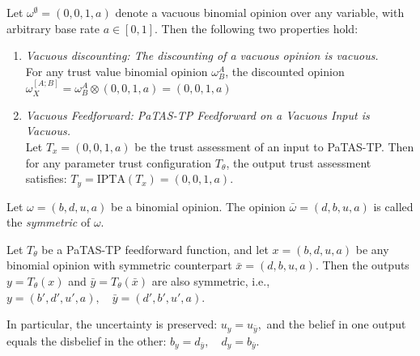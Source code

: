 \begin{theorem}\label{thm:infvac}
Let \( \omega^\emptyset = (0, 0, 1, a) \) denote a vacuous binomial opinion over any variable, with arbitrary base rate \( a \in [0, 1] \). Then the following two properties hold:

\begin{enumerate}
    \item \emph{Vacuous discounting: The discounting of a vacuous opinion is vacuous.} \\
    For any trust value binomial opinion \(\omega^A_B \), the discounted opinion
    \(
    \omega^{[A;B]}_X = \omega^A_B \otimes (0,0,1,a)= (0,0,1,a)
    \)
    \item \emph{Vacuous Feedforward: \ac{PaTAS-TP} Feedforward on a Vacuous Input is Vacuous.} \\
     Let \( T_x = (0,0,1,a)\) be the trust assessment of an input to \ac{PaTAS-TP}. Then for any parameter trust configuration \( T_\theta \), the output trust assessment satisfies:
    \(
    T_y = \text{IPTA}(T_x) = (0,0,1,a).
    \)
\end{enumerate}
\end{theorem}
\begin{definition}
Let \(\omega=(b, d, u, a)\) be a binomial opinion. The opinion $\bar{\omega} = (d, b, u, a)$ is called the \emph{symmetric} of $\omega$. 
\end{definition}
\begin{theorem}\label{thm:sym}
Let $T_\theta$ be a \ac{PaTAS-TP} feedforward function, and let $x = (b, d, u, a)$ be any binomial opinion with symmetric counterpart $\bar{x} = (d, b, u, a)$. Then the outputs $y = T_\theta(x)$ and $\bar{y} = T_\theta(\bar{x})$ are also symmetric, i.e.,
\(
y = (b', d', u', a), \quad \bar{y} = (d', b', u', a).
\)

In particular, the uncertainty is preserved:
\(
u_y = u_{\bar{y}},
\)
and the belief in one output equals the disbelief in the other:
\(
b_y = d_{\bar{y}}, \quad d_y = b_{\bar{y}}.
\)
\end{theorem}
